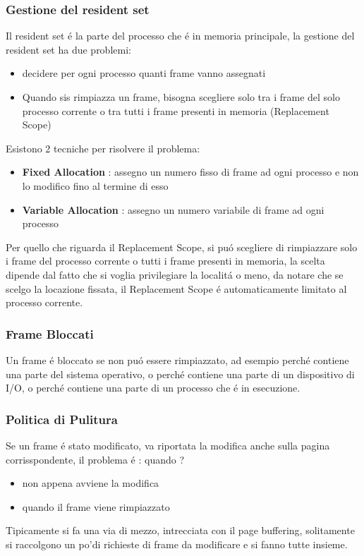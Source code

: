     \subsubsection{Gestione del resident set}
    Il resident set é la parte del processo che é in memoria principale, la  gestione del resident set ha due problemi:
    \begin{itemize}
        \item decidere per ogni processo quanti frame vanno assegnati
        \item Quando sis rimpiazza un frame, bisogna scegliere solo tra i frame del solo processo corrente o tra tutti i frame
        presenti in memoria (Replacement Scope)
    \end{itemize}
    Esistono 2 tecniche per risolvere il problema:
    \begin{itemize}
        \item \textbf{Fixed Allocation} : assegno un numero fisso di frame ad ogni processo e non lo modifico fino al termine di esso
        \item \textbf{Variable Allocation} : assegno un numero variabile di frame ad ogni processo
    \end{itemize}
    Per quello che riguarda il Replacement Scope, si puó scegliere di rimpiazzare solo i frame del processo corrente o
    tutti i frame presenti in memoria, la scelta dipende dal fatto che si voglia privilegiare la localitá o meno, da notare
    che se scelgo la locazione fissata, il Replacement Scope é automaticamente limitato al processo corrente.
    \subsubsection*{Frame Bloccati}
    Un frame é bloccato se non puó essere rimpiazzato, ad esempio perché contiene una parte del sistema operativo, o
    perché contiene una parte di un dispositivo di I/O, o perché contiene una parte di un processo che é in esecuzione.
    \subsubsection{Politica di Pulitura}
    Se un frame é stato modificato, va riportata la modifica anche sulla pagina corrisspondente, il problema é : quando ?
    \begin{itemize}
        \item non appena avviene la modifica
        \item quando il frame viene rimpiazzato
    \end{itemize}
    Tipicamente si fa una via di mezzo, intrecciata con il page buffering, solitamente si raccolgono un po'di richieste di
    frame da modificare e si fanno tutte insieme.
